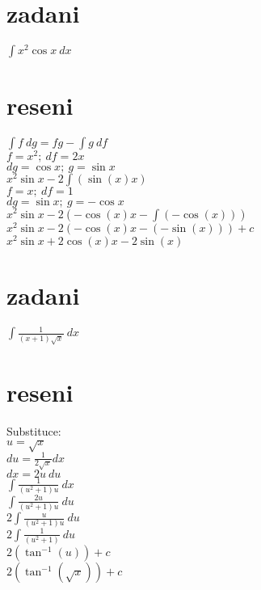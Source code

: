 \documentclass[a4paper]{article}
\def\doubleunderline#1{\underline{\underline{#1}}}
\begin{document}
\section*{zadani}
$\int x^2 \cos x~dx$

\section*{reseni}
$\int f~dg = fg-\int g~df$\\
\indent $f=x^2;~df=2x$\\
\indent $dg=\cos x;~g=\sin x$\\
$x^2\sin x - 2\int(\sin(x)x)$\\
\indent $f=x;~df=1$\\
\indent $dg=\sin x;~g=-\cos x$\\
$x^2\sin x - 2(-\cos(x)x-\int(-\cos(x)))$\\
$x^2\sin x - 2(-\cos(x)x-(-\sin(x))) + c$\\
\doubleunderline{$x^2\sin x +2\cos(x)x-2\sin(x)$}\\








\section*{zadani}
$\int \frac{1}{(x+1)\sqrt{x}}~dx$

\section*{reseni}
Substituce:\\
$u=\sqrt{x}$\\
\indent$du=\frac{1}{2\sqrt{x}}dx$\\
\indent$dx=2u~du$\\
$\int \frac{1}{(u^2+1)u}~dx$\\
$\int \frac{2u}{(u^2+1)u}~du$\\
$2\int \frac{u}{(u^2+1)u}~du$\\
$2\int \frac{1}{(u^2+1)}~du$\\
$2(\tan^{-1}(u))+c$\\
\doubleunderline{$2(\tan^{-1}(\sqrt{x}))+c$}\\
\end{document}

